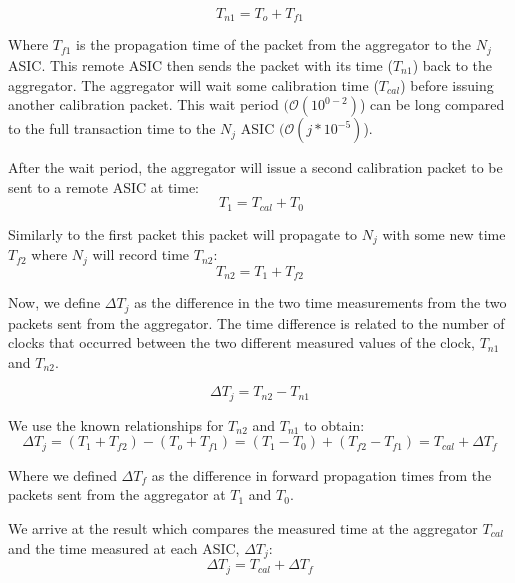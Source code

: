 \begin{equation}
  T_{n1} = T_{o} + T_{f1}
\end{equation}


Where $T_{f1}$ is the propagation time of the packet from the aggregator to the $N_{j}$ ASIC.
This remote ASIC then sends the packet with its time ($T_{n1}$) back to the aggregator.
The aggregator will wait some calibration time ($T_{cal}$) before issuing another calibration packet.
This wait period $(\mathcal{O}(10^{0-2})$) can be long compared to the full transaction time to the $N_{j}$ ASIC $(\mathcal{O}(j*10^{-5})$).

After the wait period, the aggregator will issue a second calibration packet to be sent to a remote ASIC at time:
\begin{equation}~\label{eq:calibration_wait_time}
  T_{1} = T_{cal} + T_{0}
\end{equation}

Similarly to the first packet this packet will propagate to $N_{j}$ with some new time $T_{f2}$ where $N_{j}$ will record time $T_{n2}$:
\begin{equation}
  T_{n2} = T_{1} + T_{f2}
\end{equation}

Now, we define $\Delta T_{j}$ as the difference in the two time measurements from the two packets sent from the aggregator.
The time difference is related to the number of clocks that occurred between the two different measured values of the clock, $T_{n1}$ and $T_{n2}$.

\begin{equation}
  \Delta T_{j} = T_{n2} - T_{n1}
\end{equation}

We use the known relationships for $T_{n2}$ and $T_{n1}$ to obtain:
\begin{equation}
  \Delta T_{j} = (T_{1} + T_{f2}) - (T_{o} + T_{f1}) = (T_{1} - T_{0}) + (T_{f2} - T_{f1}) = T_{cal} + \Delta T_{f}
\end{equation}

Where we defined $\Delta T_{f}$ as the difference in forward propagation times from the packets sent from the aggregator at $T_{1}$ and $T_{0}$.

We arrive at the result which compares the measured time at the aggregator $T_{cal}$ and the time measured at each ASIC, $\Delta T_{j}$:
\begin{equation}
  \Delta T_{j} = T_{cal} + \Delta T_{f}
\end{equation}

